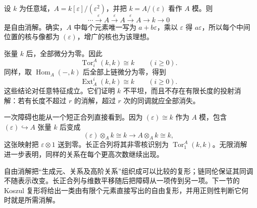 \begin{example}\label{g5:exm:dual-numbers-infinite-tor}
	设 \(k\) 为任意域，\(A=k[\varepsilon]/(\varepsilon^2)\)，并把
	\(k=A/(\varepsilon)\) 看作 \(A\) 模。则
	\[
		\cdots\xrightarrow{\varepsilon}A
		\xrightarrow{\varepsilon}A
		\xrightarrow{\varepsilon}A\longrightarrow k\longrightarrow0
	\]
	是自由消解。确实，\(A\) 中每个元素唯一写为 \(a+b\varepsilon\)，乘以 \(\varepsilon\) 得 \(a\varepsilon\)，所以每个中间位置的核与像都为 \((\varepsilon)\)，增广的核也为该理想。

	张量 \(k\) 后，全部微分为零。因此
	\[
		\operatorname{Tor}_i^A(k,k)\cong k\qquad(i\geq0).
	\]
	同样，取 \(\operatorname{Hom}_A(-,k)\) 后全部上链微分为零，得到
	\[
		\operatorname{Ext}^i_A(k,k)\cong k\qquad(i\geq0).
	\]
	这些结论对任意特征成立。它们证明 \(k\) 不平坦，而且不存在有限长度的投射消解：若有长度不超过 \(r\) 的消解，超过 \(r\) 次的同调就应全部消失。

	一次障碍也能从一个短正合列直接看到。因为 \((\varepsilon)\cong k\) 作为 \(A\) 模，包含 \((\varepsilon)\hookrightarrow A\) 张量 \(k\) 后变成
	\[
		(\varepsilon)\otimes_A k\cong k
		\longrightarrow A\otimes_A k\cong k,
	\]
	这张映射把 \(\varepsilon\otimes1\) 送到零。长正合列将其非零核识别为
	\(\operatorname{Tor}_1^A(k,k)\)。无限消解进一步表明，同样的关系在每个更高次数继续出现。
\end{example}

自由消解把“生成元、关系及高阶关系”组织成可以比较的复形；链同伦保证其同调不随表示改变。长正合列与维数平移随后把障碍从一项传到另一项。下一节的 Koszul 复形将给出一类由有限个元素直接写出的自由复形，并用正则性判断它何时就是所需消解。
